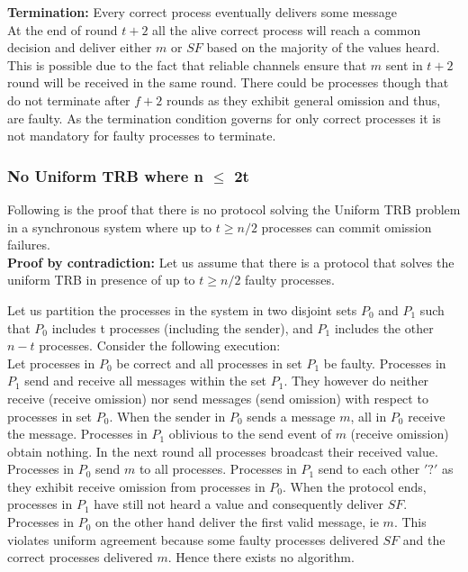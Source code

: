 \documentclass[11pt,a4paper]{article}
\begin{document}
\textbf{Termination:} Every correct process eventually delivers some message\\

At the end of round $t+2$ all the alive correct process will reach a common decision and deliver either $m$ 
or $SF$ based on the majority of the values heard. This is possible due to the fact that reliable channels ensure that $m$ sent in $t+2$ round will be received in the
same round. There could be processes though that do not terminate after $f+2$ rounds as they exhibit
general omission and thus, are faulty. As the termination condition governs for only correct 
processes it is not mandatory for faulty processes to terminate.

\subsubsection*{No Uniform TRB where n $\le$ 2t} 
Following is the proof that there is no protocol solving the Uniform TRB problem in a synchronous 
system where up to $t \ge n/2$ processes can commit omission failures.\\


\textbf{Proof by contradiction:} Let us assume that there is a protocol that solves the uniform 
TRB in presence of up to $t \ge n/2$ faulty processes. 

Let us partition the processes in the system in two disjoint sets $P_0$ and $P_1$ such that $P_0$ includes t 
processes (including the sender), and $P_1$ includes the other $n-t$ processes. Consider the following execution:\\
Let processes in $P_0$ be correct and all processes in set $P_1$ be faulty. Processes in $P_1$ 
send and receive all messages within the set $P_1$. They however do neither receive (receive omission)
nor send messages (send omission) with respect to  processes in set $P_0$. 
When the sender in $P_0$ sends a message $m$, all in $P_0$ receive the message. Processes in $P_1$
oblivious to the send event of $m$ (receive omission) obtain nothing. In the next round all 
processes broadcast their received value. Processes in $P_0$ send $m$ to all processes. Processes in $P_1$ send to each other $'?'$  as they
exhibit receive omission from processes in $P_0$.  When the protocol ends, processes in $P_1$ have still not heard 
a value and consequently deliver $SF$. Processes in $P_0$ on the other hand deliver the first valid
message, ie $m$. This violates uniform agreement because some  faulty processes delivered $SF$ 
and the correct processes delivered $m$. Hence there exists no algorithm.
\end{document}
